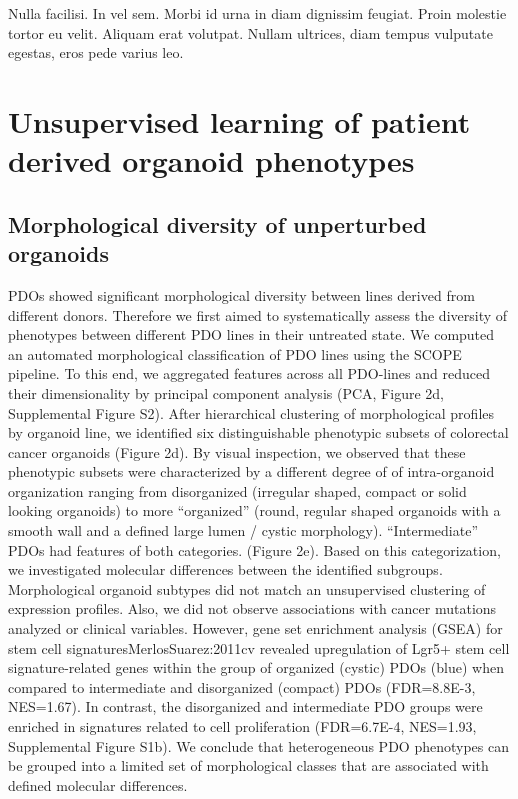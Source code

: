 \begin{savequote}[75mm]
Nulla facilisi. In vel sem. Morbi id urna in diam dignissim feugiat. Proin molestie tortor eu velit. Aliquam erat volutpat. Nullam ultrices, diam tempus vulputate egestas, eros pede varius leo.
\end{savequote}


\chapter{Unsupervised learning of patient derived organoid phenotypes}

\section{Morphological diversity of unperturbed organoids}

PDOs showed significant morphological diversity between lines derived from different donors. Therefore we first aimed to systematically assess the diversity of phenotypes between different PDO lines in their untreated state. We computed an automated morphological classification of PDO lines using the SCOPE pipeline. To this end, we aggregated features across all PDO-lines and reduced their dimensionality by principal component analysis (PCA, Figure 2d, Supplemental Figure S2). After hierarchical clustering of morphological profiles by organoid line, we identified six distinguishable phenotypic subsets of colorectal cancer organoids (Figure 2d). By visual inspection, we observed that these phenotypic subsets were characterized by a different degree of of intra-organoid organization ranging from disorganized (irregular shaped, compact or solid looking organoids) to more “organized” (round, regular shaped organoids with a smooth wall and a defined large lumen / cystic morphology). “Intermediate” PDOs had features of both categories. (Figure 2e). Based on this categorization, we investigated molecular differences between the identified subgroups. Morphological organoid subtypes did not match an unsupervised clustering of expression profiles. Also, we did not observe associations with cancer mutations analyzed or clinical variables. However, gene set enrichment analysis (GSEA) for stem cell signatures{MerlosSuarez:2011cv} revealed upregulation of Lgr5+ stem cell signature-related genes within the group of organized (cystic) PDOs (blue) when compared to intermediate and disorganized (compact) PDOs (FDR=8.8E-3, NES=1.67). In contrast, the disorganized and intermediate PDO groups were enriched in signatures related to cell proliferation (FDR=6.7E-4, NES=1.93, Supplemental Figure S1b). We conclude that heterogeneous PDO phenotypes can be grouped into a limited set of morphological classes that are associated with defined molecular differences. 

